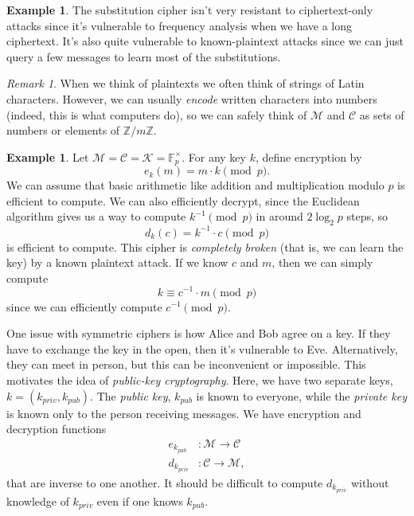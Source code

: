 \documentclass[12pt]{article}
\theoremstyle{plain}
\theoremstyle{definition}
\newtheorem{example}[theorem]{Example}
\theoremstyle{remark}
\newtheorem{remark}[theorem]{Remark}
\newcommand{\Z}{\mathbb{Z}}
\newcommand{\F}{\mathbb{F}}
\begin{document}
\begin{example}
    The substitution cipher isn't very resistant to ciphertext-only attacks since it's vulnerable to frequency analysis when we have a long ciphertext.
    It's also quite vulnerable to known-plaintext attacks since we can just query a few messages to learn most of the substitutions.
\end{example}

\begin{remark}
    When we think of plaintexts we often think of strings of Latin characters.
    However, we can usually \emph{encode} written characters into numbers (indeed, this is what computers do), so we can safely think of $\mathcal M$ and $\mathcal C$ as sets of numbers or elements of $\Z/m\Z$.
\end{remark}

\begin{example}
    Let $\mathcal M = \mathcal C = \mathcal K = \F_p^\times$.
    For any key $k$, define encryption by
    \[
        e_k(m) = m\cdot k\pmod p.
    \]
    We can assume that basic arithmetic like addition and multiplication modulo $p$ is efficient to compute.
    We can also efficiently decrypt, since the Euclidean algorithm gives us a way to compute $k^{-1}\pmod p$ in around $2\log_2 p$ steps, so
    \[
        d_k(c) = k^{-1}\cdot c \pmod p
    \]
    is efficient to compute.
    This cipher is \emph{completely broken} (that is, we can learn the key) by a known plaintext attack.
    If we know $c$ and $m$, then we can simply compute
    \[
        k \equiv c^{-1}\cdot m\pmod p
    \]
    since we can efficiently compute $c^{-1}\pmod p$.
\end{example}

One issue with symmetric ciphers is how Alice and Bob agree on a key.
If they have to exchange the key in the open, then it's vulnerable to Eve.
Alternatively, they can meet in person, but this can be inconvenient or impossible.
This motivates the idea of \emph{public-key cryptography}.
Here, we have two separate keys, $k = (k_{priv}, k_{pub})$.
The \emph{public key}, $k_{pub}$ is known to everyone, while the \emph{private key} is known only to the person receiving messages.
We have encryption and decryption functions
\begin{align*}
    e_{k_{pub}} &: \mathcal M\to \mathcal C\\
    d_{k_{priv}} &: \mathcal C\to \mathcal M,
\end{align*}
that are inverse to one another.
It should be difficult to compute $d_{k_{priv}}$ without knowledge of $k_{priv}$ even if one knows $k_{pub}$.
\end{document}
